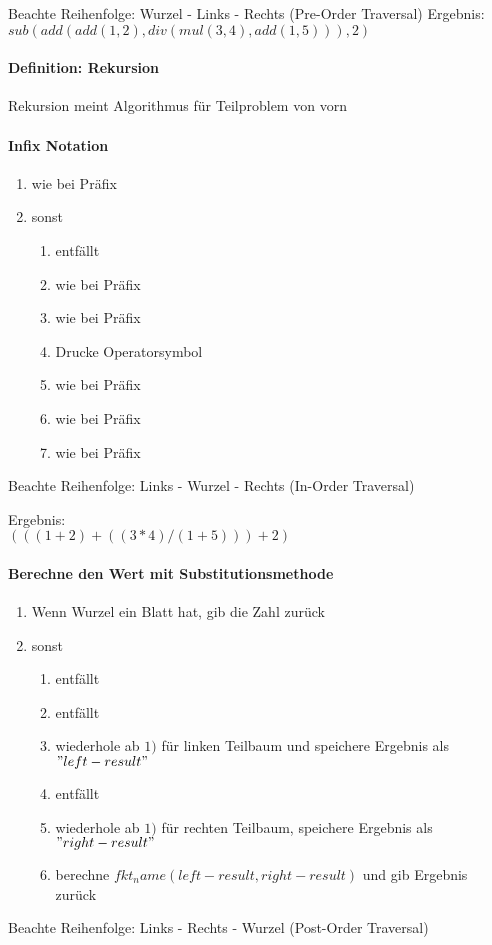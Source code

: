 \documentclass{article}
\begin{document}
 	Beachte Reihenfolge: Wurzel - Links - Rechts (Pre-Order Traversal)
		Ergebnis: \\
		$sub(add(add(1,2), div(mul(3,4), add(1,5))),2)$

	\paragraph{Definition: Rekursion}
		Rekursion meint Algorithmus für Teilproblem von vorn
		
	\paragraph{Infix Notation}
	
	\begin{enumerate}
		\item wie bei Präfix
		\item sonst
		\begin{enumerate}
			\item entfällt
			\item wie bei Präfix
			\item wie bei Präfix
			\item Drucke Operatorsymbol
			\item wie bei Präfix 
			\item wie bei Präfix
			\item wie bei Präfix
		\end{enumerate}
	\end{enumerate}
	 	Beachte Reihenfolge: Links - Wurzel - Rechts (In-Order Traversal) \newline
	 	
		Ergebnis: \\
		$(((1 + 2) + ((3 * 4)/(1 + 5))) + 2)$
	
	\paragraph{Berechne den Wert mit Substitutionsmethode}
		\begin{enumerate}
			\item Wenn Wurzel ein Blatt hat, gib die Zahl zurück
			\item sonst
			\begin{enumerate}
				\item entfällt
				\item entfällt
				\item wiederhole ab $1)$ für linken Teilbaum und speichere Ergebnis als $"left-result"$
				\item entfällt
				\item wiederhole ab $1)$ für rechten Teilbaum, speichere Ergebnis als $"right-result"$
				\item berechne $fkt_name(left-result, right-result)$ und gib Ergebnis zurück
			\end{enumerate}
		\end{enumerate}
		Beachte Reihenfolge: Links - Rechts - Wurzel (Post-Order Traversal)
		
\end{document}

